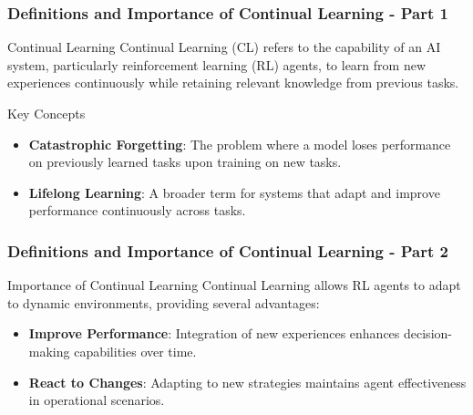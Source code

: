 \documentclass[aspectratio=169]{beamer}
\begin{document}
\begin{frame}[fragile]
    \frametitle{Definitions and Importance of Continual Learning - Part 1}
    \begin{block}{Continual Learning}
        Continual Learning (CL) refers to the capability of an AI system, particularly reinforcement learning (RL) agents, to learn from new experiences continuously while retaining relevant knowledge from previous tasks. 
    \end{block}
    
    \begin{block}{Key Concepts}
        \begin{itemize}
            \item \textbf{Catastrophic Forgetting}: The problem where a model loses performance on previously learned tasks upon training on new tasks.
            \item \textbf{Lifelong Learning}: A broader term for systems that adapt and improve performance continuously across tasks.
        \end{itemize}
    \end{block}
\end{frame}

\begin{frame}[fragile]
    \frametitle{Definitions and Importance of Continual Learning - Part 2}
    \begin{block}{Importance of Continual Learning}
        Continual Learning allows RL agents to adapt to dynamic environments, providing several advantages:
    \end{block}

    \begin{itemize}
        \item \textbf{Improve Performance}: Integration of new experiences enhances decision-making capabilities over time.
        \item \textbf{React to Changes}: Adapting to new strategies maintains agent effectiveness in operational scenarios.
    \end{itemize}
\end{frame}
\end{document}
